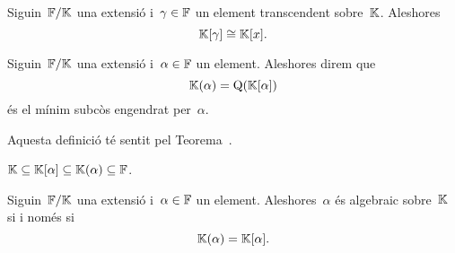 \documentclass[../Apunts.tex]{subfiles}
\begin{document}
	\begin{corollary}
		\label{cor:el mínim subanell engendrat per un transcendent és isomorfa a l'anell de polinomis}
		Siguin~\(\mathbb{F}/\mathbb{K}\) una extensió i~\(\gamma\in\mathbb{F}\) un element transcendent sobre~\(\mathbb{K}\). Aleshores
		\[\mathbb{K}[\gamma]\cong\mathbb{K}[x].\]
	\end{corollary}
	\begin{definition}
		\label{def:mínim subcòs engendrat per un element d'una extensió}
		Siguin~\(\mathbb{F}/\mathbb{K}\) una extensió i~\(\alpha\in\mathbb{F}\) un element. Aleshores direm que
		\[\mathbb{K}(\alpha)=\operatorname{Q}(\mathbb{K}[\alpha])\]
		és el mínim subcòs engendrat per~\(\alpha\).
		
		Aquesta definició té sentit pel Teorema~.
	\end{definition}
	\begin{observation}
		\label{obs:inclusió del mínim subanell i subcòs engendrats per un element}
		\(\mathbb{K}\subseteq\mathbb{K}[\alpha]\subseteq\mathbb{K}(\alpha)\subseteq\mathbb{F}\).
	\end{observation}
	\begin{lemma}
		\label{lema:un element és algebraic si i només si el mínim subanell engendrat per l'element és un cos}
		Siguin~\(\mathbb{F}/\mathbb{K}\) una extensió i~\(\alpha\in\mathbb{F}\) un element. Aleshores~\(\alpha\) és algebraic sobre~\(\mathbb{K}\) si i només si
		\[\mathbb{K}(\alpha)=\mathbb{K}[\alpha].\]
	\end{lemma}
\end{document}
